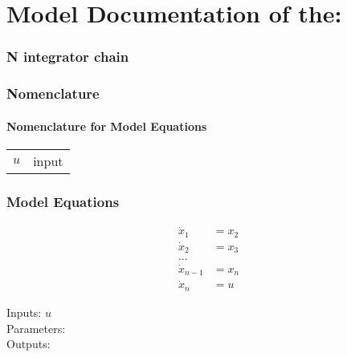 \documentclass[10pt,a4paper]{article}
\begin{document}
	\part*{Model Documentation of the:}
	\section*{N integrator chain} %
	
	
	\section{Nomenclature} %
	\subsection{Nomenclature for Model Equations} %
	
	\begin{tabular}{ll}
		$u$ & input		
	\end{tabular}	
	
	
	\section{Model Equations} %
	
	\begin{subequations}
	\begin{align}
		\dot{x}_1 &= x_2 	\\      %
		\dot{x}_2 &= x_3	\\
		... &				\\
		\dot{x}_{n-1} &= x_n \\
		\dot{x}_n &= u 
	\end{align}
	\end{subequations}

	\noindent
	Inputs: $u$ 
	\\
	Parameters:  %
	\\
	Outputs:  %
	
		
\end{document}
